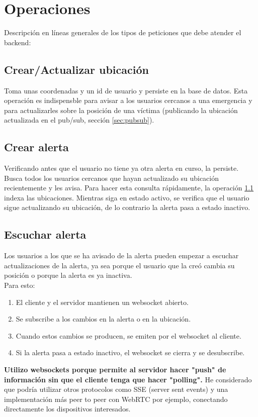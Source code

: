 \section{Operaciones}

Descripción en líneas generales de los tipos de peticiones que debe atender el backend:

\subsection{Crear/Actualizar ubicación}\label{op:ubi}
Toma unas coordenadas y un id de usuario y persiste en la base de datos.
Esta operación es indispensble para avisar a los usuarios cercanos a una emergencia y para 
actualizarles sobre la posición de una víctima (publicando la ubicación actualizada en el pub/sub, sección \ref{sec:pubsub}).

\subsection{Crear alerta}
Verificando antes que el usuario no tiene ya otra alerta en curso, la persiste.
Busca todos los usuarios cercanos que hayan actualizado su ubicación recientemente y les avisa. Para hacer
esta consulta rápidamente, la operación \ref{op:ubi} indexa las ubicaciones.
Mientras siga en estado activo, se verifica que el usuario sigue actualizando su ubicación, de lo contrario la alerta pasa a estado inactivo.

\subsection{Escuchar alerta}\label{subsec:websocket}
Los usuarios a los que se ha avisado de la alerta pueden empezar a escuchar actualizaciones de la alerta,
ya sea porque el usuario que la creó cambia su posición o porque la alerta es ya inactiva. \\
Para esto:
\begin{enumerate}
	\item El cliente y el servidor mantienen un websocket abierto.
	\item Se subscribe a los cambios en la alerta o en la ubicación.
	\item Cuando estos cambios se producen, se emiten por el websocket al cliente.
	\item Si la alerta pasa a estado inactivo, el websocket se cierra y se desubscribe.
\end{enumerate}
\textbf{Utilizo websockets porque permite al servidor hacer "push" de información sin que el cliente tenga que hacer "polling".}
He considerado que podría utilizar otros protocolos como SSE (server sent events) y una implementación más peer to peer con WebRTC por ejemplo, conectando directamente los dispositivos interesados.

